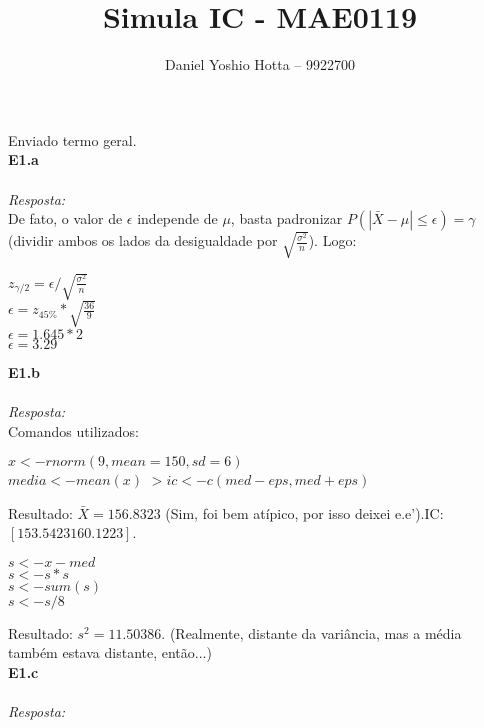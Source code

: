 \documentclass{article}
\begin{document}
	
	\title{Simula IC - MAE0119}
	\author{Daniel Yoshio Hotta – 9922700}
	
	\maketitle	
	
	Enviado termo geral.\\
	
	\textbf {E1.a} 
	\\ \\
	\textit {Resposta:} \\
	
	De fato, o valor de $\epsilon$ independe de $\mu$, basta padronizar $P(|\bar{X} - \mu| \leq \epsilon) = \gamma$ (dividir ambos os lados da desigualdade por $\sqrt{\frac{\sigma^2}{n}}$). Logo:
	
	\begin{center}
		$z_{\gamma/2} = \epsilon / \sqrt{\frac{\sigma^2}{n}}$\\
		$\epsilon = z_{45\%} * \sqrt{\frac{36}{9}}$\\
		$\epsilon = 1.645 * 2$\\
		$\epsilon = 3.29$
    \end{center}
		
	\textbf {E1.b} 
	\\ \\
	\textit {Resposta:} \\	
	
	Comandos utilizados:
	
	\begin{center}
		$x <- rnorm(9, mean = 150, sd = 6)$\\
		$media <- mean (x)$	
		$> ic <- c (med - eps, med + eps)$
	\end{center}
		
	Resultado: $\bar{X} = 156.8323$ (Sim, foi bem atípico, por isso deixei e.e').IC: $[153.5423 160.1223]$.
	
	\begin{center}
		$s <- x - med$\\
		$s <- s * s $\\
		$ s <- sum (s)$\\
		$s <- s / 8$
	\end{center}
		
	Resultado:  $s^2 = 11.50386$. (Realmente, distante da variância, mas a média também estava distante, então...)\\
	
	\textbf {E1.c} 
	\\ \\
	\textit {Resposta:} \\	
	
	
\end{document}
